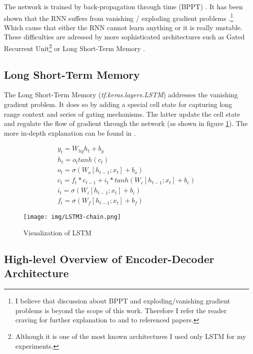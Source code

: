 The network is trained by back-propagation through time (BPPT) \citep{bpptWerbos1990}. It has been shown that the RNN suffers from vanishing / exploding gradient problems \citep{hochreiter1997}.\footnote{I believe that discussion about BPPT and exploding/vanishing gradient problems is beyond the scope of this work. Therefore I refer the reader craving for further explanation to \citep{Goodfellow-et-al-2016} and to referenced papers.} Which cause that either the RNN cannot learn anything or it is really unstable. These difficulties are adressed by more sophisticated architectures such as Gated Recurrent Unit\footnote{Although it is one of the most known architectures I used only LSTM for my experiments. } \citep{cho2014learning} or Long Short-Term Memory \citep{hochreiter1997}.


\subsection{Long Short-Term Memory}

The Long Short-Term Memory (\emph{tf.ke\-ras.lay\-ers.LSTM}) addresses the vanishing gradient problem. It does so by adding a special cell state for capturing long range context and series of gating mechanisms. The latter update the cell state and regulate the flow of gradient through the network (as shown in figure \ref{lstm}). The more in-depth explanation can be found in \citep{Olah2015}.

\begin{figure}[!ht]
    \begin{gather}
        y_t = W_{hy}h_t + b_y \\
        h_t = o_t tanh(c_t) \\
        o_t = \sigma(W_o[h_{t-1};x_t] + b_o) \\
        c_t = f_t * c_{t-1} + i_t * tanh(W_c[h_{t-1}; x_t] + b_c)\\
        i_t = \sigma(W_i[h_{t-1}; x_t] + b_i)\\
        f_t = \sigma(W_f[h_{t-1}; x_t] + b_f)
    \end{gather}
\end{figure}
\begin{figure}[!ht]
    \centering
    \texttt{[image: img/LSTM3-chain.png]}
    \caption{Visualization of LSTM \citep{Olah2015}} \label{lstm}
\end{figure}

\subsection{High-level Overview of Encoder-Decoder Architecture} \label{high-level_enc_dec_section}

